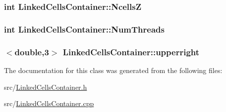 \subsubsection[{\texorpdfstring{NcellsZ}{NcellsZ}}]{\setlength{\rightskip}{0pt plus 5cm}int Linked\+Cells\+Container\+::\+NcellsZ\hspace{0.3cm}{\ttfamily [private]}}\hypertarget{classLinkedCellsContainer_a422564396900533ee91d18fb9ead2c97}{}\label{classLinkedCellsContainer_a422564396900533ee91d18fb9ead2c97}
\subsubsection[{\texorpdfstring{Num\+Threads}{NumThreads}}]{\setlength{\rightskip}{0pt plus 5cm}int Linked\+Cells\+Container\+::\+Num\+Threads\hspace{0.3cm}{\ttfamily [private]}}\hypertarget{classLinkedCellsContainer_ac8ae53015a3e5ed5bf413677dc3b506c}{}\label{classLinkedCellsContainer_ac8ae53015a3e5ed5bf413677dc3b506c}
\subsubsection[{\texorpdfstring{upperright}{upperright}}]{$<$double,3$>$ Linked\+Cells\+Container\+::upperright\hspace{0.3cm}{\ttfamily [private]}}\hypertarget{classLinkedCellsContainer_a81d492dc2e1948839a6a45b0b1fe463f}{}\label{classLinkedCellsContainer_a81d492dc2e1948839a6a45b0b1fe463f}


The documentation for this class was generated from the following files\+:\begin{DoxyCompactItemize}
\item 
src/\hyperlink{LinkedCellsContainer_8h}{Linked\+Cells\+Container.\+h}\item 
src/\hyperlink{LinkedCellsContainer_8cpp}{Linked\+Cells\+Container.\+cpp}\end{DoxyCompactItemize}
